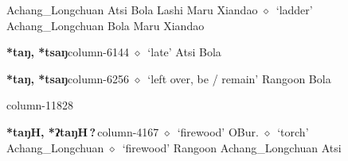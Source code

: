          Achang\_Longchuan 
\hspace{1ex}
         Atsi 
\hspace{1ex}
         Bola 
\hspace{1ex}
         Lashi 
\hspace{1ex}
         Maru 
\hspace{1ex}
         Xiandao 
\hspace{1ex}
         $\diamond$~`ladder'
         Achang\_Longchuan 
\hspace{1ex}
         Bola 
\hspace{1ex}
         Maru 
\hspace{1ex}
         Xiandao 
  \item {\footnotesize \textbf{*taŋ, *tsaŋ}}{\tiny column-6144}
         $\diamond$~`late'
         Atsi 
\hspace{1ex}
         Bola 
  \item {\footnotesize \textbf{*taŋ, *tsaŋ}}{\tiny column-6256}
         $\diamond$~`left over, be / remain'
         Rangoon 
\hspace{1ex}
         Bola 
  \item {\footnotesize \textbf{}}{\tiny column-11828}
  \item {\footnotesize \textbf{*taŋH, *ʔtaŋH\,?\,}}{\tiny column-4167}
         $\diamond$~`firewood'
         OBur. 
\hspace{1ex}
         $\diamond$~`torch'
         Achang\_Longchuan 
\hspace{1ex}
         $\diamond$~`firewood'
         Rangoon 
\hspace{1ex}
         Achang\_Longchuan 
\hspace{1ex}
         Atsi 
\hspace{1ex}
